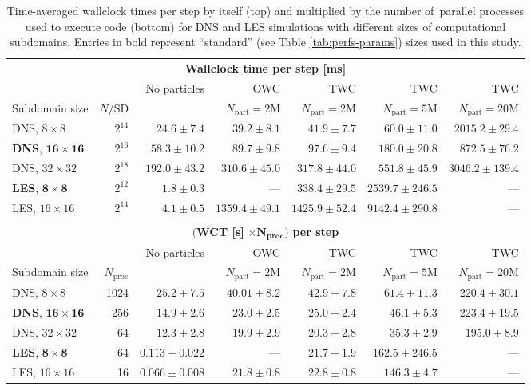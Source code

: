 \documentclass{pracamgren}
\begin{document}
\begin{table}[h]
\centering
\scriptsize
\begin{tabular}{lrrrrrr}
\multicolumn{7}{c}{\textbf{Wallclock time per step [ms]}} \\
 & & No particles & OWC & TWC & TWC & TWC \\ 
Subdomain size & $N / \text{SD}$ &  & $N_{\text{part}} = 2 \text{M}$ & $N_{\text{part}} = 2 \text{M}$ & $N_{\text{part}} = 5 \text{M}$ & $N_{\text{part}} = 20 \text{M}$ \\ \hline

DNS, $8 \times 8$ & $2^{14}$ & $24.6 \pm 7.4$ & $39.2 \pm 8.1$ & $41.9 \pm 7.7$ & $60.0 \pm 11.0$ & $2015.2 \pm 29.4$ \\
\textbf{DNS}, $\mathbf{16 \times 16}$ & $2^{16}$ & $58.3 \pm 10.2$ & $89.7 \pm 9.8$ & $97.6 \pm 9.4$ & $180.0 \pm 20.8$ & $872.5 \pm 76.2$ \\
DNS, $32 \times 32$ & $2^{18}$ & $192.0 \pm 43.2$ & $310.6 \pm 45.0$ & $317.8 \pm 44.0$ & $551.8 \pm 45.9$ & $3046.2 \pm 139.4$ \\ \hline
\textbf{LES}, $\mathbf{8 \times 8}$ & $2^{12}$ & $1.8 \pm 0.3$ & --- & $338.4 \pm 29.5$ & $2539.7 \pm 246.5$ & --- \\
LES, $16 \times 16$ & $2^{14}$ & $4.1 \pm 0.5$ & $1359.4 \pm 49.1$ & $1425.9 \pm 52.4$ & $9142.4 \pm 290.8$ & --- \\ \hline \hline
 & & & & & & \\
\multicolumn{7}{c}{$\mathbf{(}$\textbf{WCT [s]} $\mathbf{\times N_{\text{proc}})}$ \textbf{per step}} \\
 & & No particles & OWC & TWC & TWC & TWC \\ 
Subdomain size & $N_{\text{proc}}$ &  & $N_{\text{part}} = 2 \text{M}$ & $N_{\text{part}} = 2 \text{M}$ & $N_{\text{part}} = 5 \text{M}$ & $N_{\text{part}} = 20 \text{M}$ \\ \hline

DNS, $8 \times 8$ & 1024 & $25.2 \pm 7.5$ & $40.01 \pm 8.2$ & $42.9 \pm 7.8$ & $61.4 \pm 11.3$ & $220.4 \pm 30.1$ \\
\textbf{DNS}, $\mathbf{16 \times 16}$ & 256 & $14.9 \pm 2.6$ & $23.0 \pm 2.5$ & $25.0 \pm 2.4$ & $46.1 \pm 5.3$ & $223.4 \pm 19.5$ \\
DNS, $32 \times 32$ & 64 & $12.3 \pm 2.8$ & $19.9 \pm 2.9$ & $20.3 \pm 2.8$ & $35.3 \pm 2.9$ & $195.0 \pm 8.9$ \\ \hline
\textbf{LES}, $\mathbf{8 \times 8}$ & 64 & $0.113 \pm 0.022$ & --- & $21.7 \pm 1.9$ & $162.5 \pm 246.5$ & --- \\
LES, $16 \times 16$ & 16 & $0.066 \pm 0.008$ & $21.8 \pm 0.8$ & $22.8 \pm 0.8$ & $146.3 \pm 4.7$ & --- \\ \hline \hline
\end{tabular}
\caption{Time-averaged wallclock times per step by itself (top) and multiplied by the number of~parallel processes used to execute code (bottom) for DNS and LES simulations with different sizes of computational subdomains.
Entries in bold represent ``standard'' (see Table \ref{tab:perfs-params}) sizes used in this study.
}
\label{tab:perfs-pfg}
\end{table}
\end{document}
